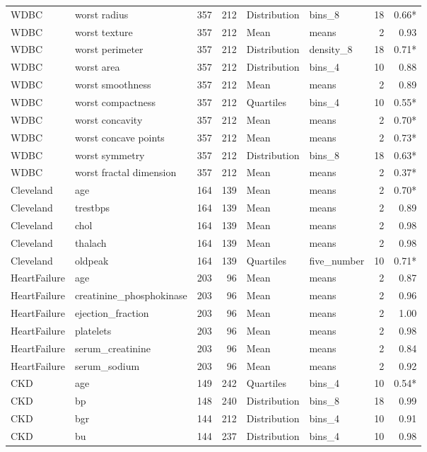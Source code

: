 \begin{longtable}{p{1.95cm}p{4.25cm}rrp{1.7cm}p{2.1cm}rr}
WDBC & worst radius & 357 & 212 & Distribution & bins\_8 & 18 & 0.66*\\
WDBC & worst texture & 357 & 212 & Mean & means & 2 & 0.93\\
WDBC & worst perimeter & 357 & 212 & Distribution & density\_8 & 18 & 0.71*\\
WDBC & worst area & 357 & 212 & Distribution & bins\_4 & 10 & 0.88\\
WDBC & worst smoothness & 357 & 212 & Mean & means & 2 & 0.89\\
WDBC & worst compactness & 357 & 212 & Quartiles & bins\_4 & 10 & 0.55*\\
WDBC & worst concavity & 357 & 212 & Mean & means & 2 & 0.70*\\
WDBC & worst concave points & 357 & 212 & Mean & means & 2 & 0.73*\\
WDBC & worst symmetry & 357 & 212 & Distribution & bins\_8 & 18 & 0.63*\\
WDBC & worst fractal dimension & 357 & 212 & Mean & means & 2 & 0.37*\\
Cleveland & age & 164 & 139 & Mean & means & 2 & 0.70*\\
Cleveland & trestbps & 164 & 139 & Mean & means & 2 & 0.89\\
Cleveland & chol & 164 & 139 & Mean & means & 2 & 0.98\\
Cleveland & thalach & 164 & 139 & Mean & means & 2 & 0.98\\
Cleveland & oldpeak & 164 & 139 & Quartiles & five\_number & 10 & 0.71*\\
HeartFailure & age & 203 & 96 & Mean & means & 2 & 0.87\\
HeartFailure & creatinine\_phosphokinase & 203 & 96 & Mean & means & 2 & 0.96\\
HeartFailure & ejection\_fraction & 203 & 96 & Mean & means & 2 & 1.00\\
HeartFailure & platelets & 203 & 96 & Mean & means & 2 & 0.98\\
HeartFailure & serum\_creatinine & 203 & 96 & Mean & means & 2 & 0.84\\
HeartFailure & serum\_sodium & 203 & 96 & Mean & means & 2 & 0.92\\
CKD & age & 149 & 242 & Quartiles & bins\_4 & 10 & 0.54*\\
CKD & bp & 148 & 240 & Distribution & bins\_8 & 18 & 0.99\\
CKD & bgr & 144 & 212 & Distribution & bins\_4 & 10 & 0.91\\
CKD & bu & 144 & 237 & Distribution & bins\_4 & 10 & 0.98\\

\end{longtable}
